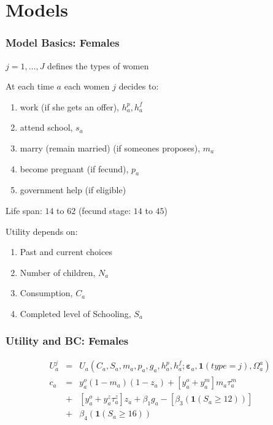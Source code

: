 \section{Models}
\begin{frame}
	\frametitle{Model Basics: Females}
		\begin{wideitemize}
		\item $j = 1, \ldots, J$ defines the types of women
		\item At each time $a$ each women $j$ decides to:
		\begin{enumerate}
			\item work (if she gets an offer), $h_{a}^p,h_{a}^f$
			\item attend school, $s_{a}$
			\item marry (remain married) (if someones proposes), $m_{a}$
			\item become pregnant (if fecund), $p_{a}$
			\item government help (if eligible)
		\end{enumerate}
		\item Life span: $14$ to $62$ (fecund stage: $14$ to $45$)
		\item Utility depends on:
			\begin{enumerate}
				\item Past and current choices
				\item Number of children, $N_{a}$
				\item Consumption, $C_{a}$
				\item Completed level of Schooling, $S_{a}$
			\end{enumerate}
		\end{wideitemize}
\end{frame}

\begin{frame}
	\frametitle{Utility and BC: Females}
	\begin{eqnarray}
	U_{a}^j &=& U_{a} \left( C_{a}, S_{a}, m_{a}, p_{a}, g_{a}, h_{a}^p, h_{a}^f; \mathbf{\varepsilon}_{a}, \mathbf{1}(type=j), \Omega_{a}^a \right) \nonumber \\
c_{a} &=& y_{a}^o (1 - m_{a})(1 - z_{a}) + \left[ y_{a}^o + y_{a}^m\right]m_{a}\tau_{a}^m \nonumber \\
	                  &+& \left[ y_{a}^o + y_{a}^z \tau_{a}^z \right]z_{a} + \beta_{1}g_{a} - [\beta_{3}  \left( \mathbf{1}(S_{a} \geq 12) \right) ] \nonumber \\ 
	                 &+& \beta_{4} \left( \mathbf{1}(S_{a} \geq 16) \right) \nonumber
	\end{eqnarray}
	
\end{frame}


